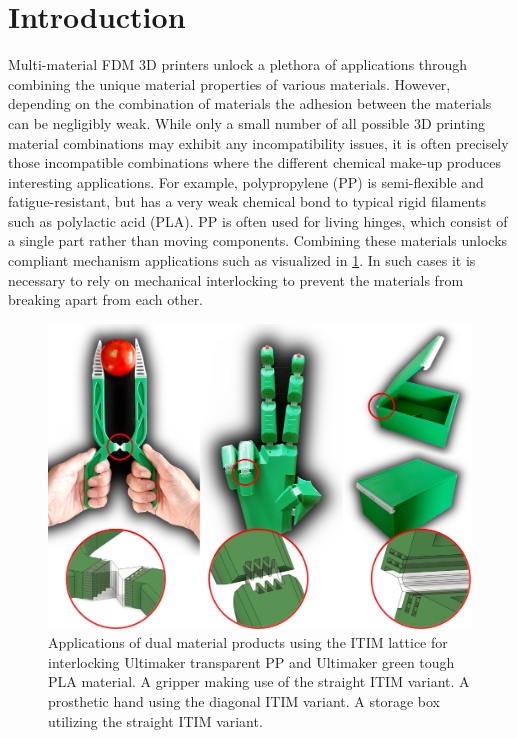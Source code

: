\section{Introduction}
Multi-material FDM 3D printers unlock a plethora of applications through combining the unique material properties of various materials.
However, depending on the combination of materials the adhesion between the materials can be negligibly weak.
While only a small number of all possible 3D printing material combinations may exhibit any incompatibility issues,
it is often precisely those incompatible combinations where the different chemical make-up produces interesting applications.
For example, polypropylene (PP) is semi-flexible and fatigue-resistant, but has a very weak chemical bond to typical rigid filaments such as polylactic acid (PLA).
PP is often used for living hinges, which consist of a single part rather than moving components.
Combining these materials unlocks compliant mechanism applications such as visualized in \cref{fig:applications}.
In such cases it is necessary to rely on mechanical interlocking to prevent the materials from breaking apart from each other.


\begin{figure}
	\centering
	\includegraphics[width=\columnwidth]{sources/applications/applications.png}
	\caption{Applications of dual material products using the ITIM lattice for interlocking Ultimaker transparent PP and Ultimaker green tough PLA material.
	A gripper making use of the straight ITIM variant.
	A prosthetic hand using the diagonal ITIM variant.
	A storage box utilizing the straight ITIM variant.
	}
	\label{fig:applications}
\end{figure}





